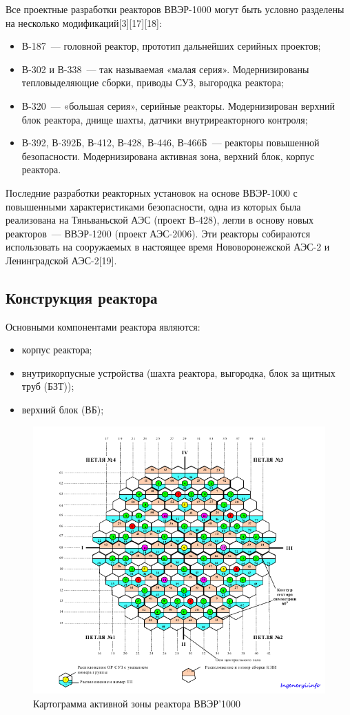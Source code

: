 \documentclass[14pt]{article}
\begin{document}
Все проектные разработки реакторов ВВЭР-1000 могут быть условно разделены на несколько модификаций[3][17][18]: 
\begin{itemize}
\item В-187 — головной реактор, прототип дальнейших серийных проектов;
\item В-302 и В-338 — так называемая «малая серия». Модернизированы тепловыделяющие сборки, приводы СУЗ, выгородка реактора;
\item В-320 — «большая серия», серийные реакторы. Модернизирован верхний блок реактора, днище шахты, датчики внутриреакторного контроля;
\item В-392, В-392Б, В-412, В-428, В-446, В-466Б — реакторы повышенной безопасности. Модернизирована активная зона, верхний блок, корпус реактора.
\end{itemize}

Последние разработки реакторных установок на основе ВВЭР-1000 с повышенными характеристиками безопасности, одна из которых была реализована на Тяньваньской АЭС (проект В-428), легли в основу новых реакторов — ВВЭР-1200 (проект АЭС-2006). Эти реакторы собираются использовать на сооружаемых в настоящее время Нововоронежской АЭС-2 и Ленинградской АЭС-2[19]. 
	\subsection{Конструкция реактора}
	
	\hspace{0.4cm}
	Основными компонентами реактора являются:
	\begin{itemize}
	    \item 	корпус реактора;
	    \item внутрикорпусные устройства (шахта реактора, выгородка, блок защитных труб (БЗТ));
	    \item верхний блок (ВБ);
	\end{itemize}
	\begin{figure}
	    \centering
	    \includegraphics[width=\linewidth]{tvs}
	    \caption{Картограмма активной зоны реактора ВВЭР'1000}
	    \label{fig:my_label}
	\end{figure}
	
\end{document}
